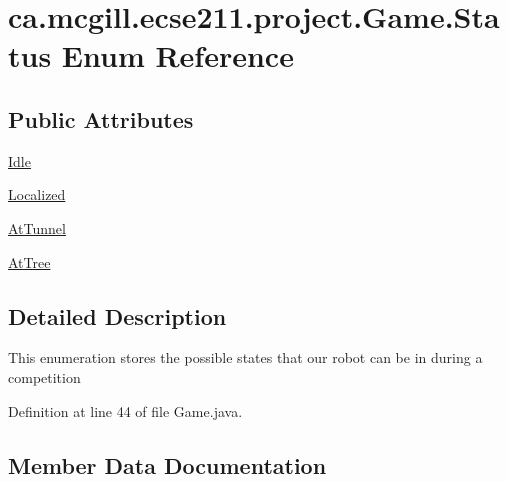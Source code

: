 \hypertarget{enumca_1_1mcgill_1_1ecse211_1_1project_1_1_game_1_1_status}{}\section{ca.\+mcgill.\+ecse211.\+project.\+Game.\+Status Enum Reference}
\label{enumca_1_1mcgill_1_1ecse211_1_1project_1_1_game_1_1_status}
\subsection*{Public Attributes}
\begin{DoxyCompactItemize}
\item 
\hyperlink{enumca_1_1mcgill_1_1ecse211_1_1project_1_1_game_1_1_status_a4ee6ac6711e6f0f96cfbe832f260c89f}{Idle}
\item 
\hyperlink{enumca_1_1mcgill_1_1ecse211_1_1project_1_1_game_1_1_status_a7d3a789bd51e152bd2643e7214a178f8}{Localized}
\item 
\hyperlink{enumca_1_1mcgill_1_1ecse211_1_1project_1_1_game_1_1_status_a7ebcaa409a8a78b543975cca230f51a3}{At\+Tunnel}
\item 
\hyperlink{enumca_1_1mcgill_1_1ecse211_1_1project_1_1_game_1_1_status_ae3a62c62aab81b3a4ada7940139ff936}{At\+Tree}
\end{DoxyCompactItemize}


\subsection{Detailed Description}
This enumeration stores the possible states that our robot can be in during a competition 

Definition at line 44 of file Game.\+java.



\subsection{Member Data Documentation}
\mbox{\label{enumca_1_1mcgill_1_1ecse211_1_1project_1_1_game_1_1_status_ae3a62c62aab81b3a4ada7940139ff936}} 
